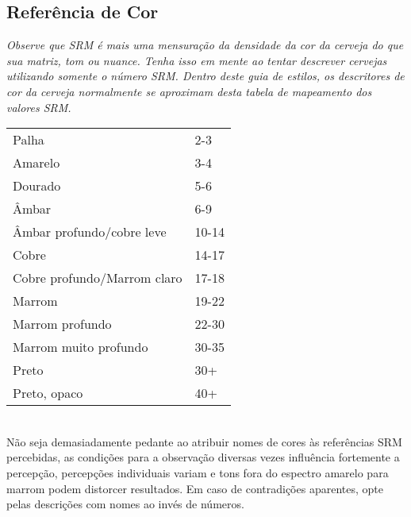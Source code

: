 \subsection*{Referência de Cor}
\textit{Observe que SRM é mais uma mensuração da densidade da cor da cerveja do que sua matriz, tom ou nuance. Tenha isso em mente ao tentar descrever cervejas utilizando somente o número SRM. Dentro deste guia de estilos, os descritores de cor da cerveja normalmente se aproximam desta tabela de mapeamento dos valores SRM.}\\
\begin{tabular}{ l l }
Palha & 2-3 \\
Amarelo & 3-4 \\
Dourado & 5-6 \\
Âmbar & 6-9 \\
Âmbar profundo/cobre leve & 10-14 \\
Cobre & 14-17 \\
Cobre profundo/Marrom claro & 17-18 \\
Marrom & 19-22 \\
Marrom profundo & 22-30 \\
Marrom muito profundo & 30-35 \\
Preto & 30+ \\
Preto, opaco & 40+
\end{tabular}\\
Não seja demasiadamente pedante ao atribuir nomes de cores às referências SRM percebidas, as condições para a observação diversas vezes influência fortemente a percepção, percepções individuais variam e tons fora do espectro amarelo para marrom podem distorcer resultados. Em caso de contradições aparentes, opte pelas descrições com nomes ao invés de números.

